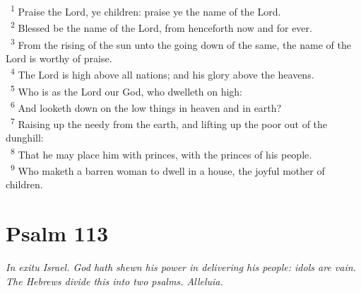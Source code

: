 \documentclass[a5paper,12pt]{article}
\begin{document}
\begin{multicols*}{2}
~\textsuperscript{1} Praise the Lord, ye children: praise ye the name of the Lord.\\
~\textsuperscript{2} Blessed be the name of the Lord, from henceforth now and for ever.\\
~\textsuperscript{3} From the rising of the sun unto the going down of the same, the name of the Lord is worthy of praise.\\
~\textsuperscript{4} The Lord is high above all nations; and his glory above the heavens.\\
~\textsuperscript{5} Who is as the Lord our God, who dwelleth on high:\\
~\textsuperscript{6} And looketh down on the low things in heaven and in earth?\\
~\textsuperscript{7} Raising up the needy from the earth, and lifting up the poor out of the dunghill:\\
~\textsuperscript{8} That he may place him with princes, with the princes of his people.\\
~\textsuperscript{9} Who maketh a barren woman to dwell in a house, the joyful mother of children.\\

\section{Psalm 113}
\label{sec:org428cae6}
\emph{In exitu Israel. God hath shewn his power in delivering his people: idols are vain. The Hebrews divide this into two psalms. Alleluia.}\\


\end{multicols*}
\end{document}
